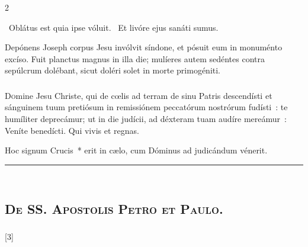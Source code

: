 \documentclass[9pt,twoside]{extarticle}
\begin{document}
\begin{multicols}{2}
{\begin{tightlist}{}
\item {}~Oblátus est quia ipse vóluit. ~Et livóre ejus sanáti sumus.
\item {} Depónens Joseph corpus Jesu invólvit síndone, et pósuit eum in monuménto excíso. Fuit planctus magnus in illa die; mulíeres autem sedéntes contra sepúlcrum dolébant, sicut doléri solet in morte primogéniti.
\end{tightlist}

\subsubsection*{\center{}}
\lettrine{D}omine Jesu Christe, qui de cœlis ad terram de sinu Patris descendísti et sánguinem tuum pretiósum in remissiónem peccatórum nostrórum fudísti~: te humíliter deprecámur; ut in die judícii, ad déxteram tuam audíre mereámur~: Veníte benedícti. Qui vivis et regnas.

\begin{tightlist}{}
\item {}
\item {} Hoc signum Crucis~* erit in cælo, cum Dóminus ad judicándum vénerit.
\end{tightlist}

\begin{center}\textcolor{red}{\rule{\linewidth}{0.5pt}} \end{center}

\subsection*{\center {}}
\subsection*{\center \textsc{\\ De SS. Apostolis Petro et Paulo.}}
\subsubsection*{\center {}}

\begin{tightlist}{}
\item {} [3] 
\end{tightlist}

}
\end{multicols}
\end{document}
